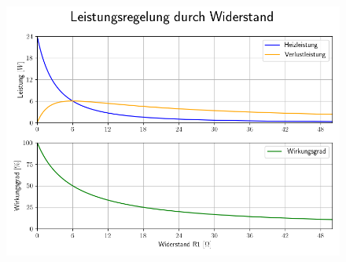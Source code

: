 \documentclass{beamer}
\begin{document}
	\begin{frame}
		\begin{center}
		\begin{figure}[tbh]
			\centering
			\includegraphics[width=0.95\linewidth]{medien/1.png}
			\label{fig:wirkungsgrad1}
		\end{figure}
		\end{center}
	\end{frame}
\end{document}
